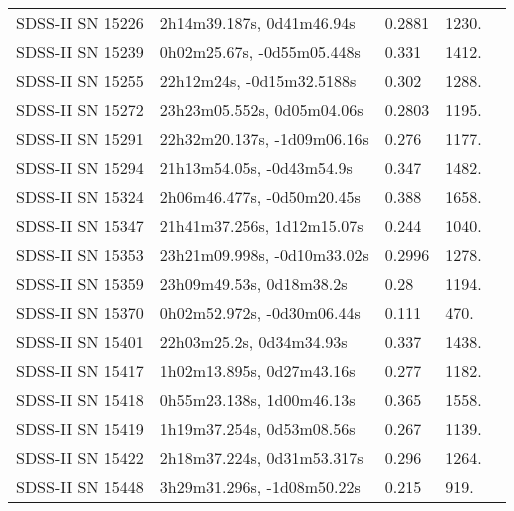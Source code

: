 \begin{longtable}{lllll}
 SDSS-II SN 15226 &      2h14m39.187s, 0d41m46.94s &   0.2881 &          1230. &    \citet{2008AJ....135.1311A} \\
 SDSS-II SN 15239 &     0h02m25.67s, -0d55m05.448s &    0.331 &          1412. &    \citet{2011ApJ...738..162S} \\
 SDSS-II SN 15255 &      22h12m24s, -0d15m32.5188s &    0.302 &          1288. &    \citet{2011ApJ...738..162S} \\
 SDSS-II SN 15272 &     23h23m05.552s, 0d05m04.06s &   0.2803 &          1195. &    \citet{2011ApJ...738..162S} \\
 SDSS-II SN 15291 &    22h32m20.137s, -1d09m06.16s &    0.276 &          1177. &    \citet{2011ApJ...738..162S} \\
 SDSS-II SN 15294 &      21h13m54.05s, -0d43m54.9s &    0.347 &          1482. &    \citet{2010ApJ...713.1026D} \\
 SDSS-II SN 15324 &     2h06m46.477s, -0d50m20.45s &    0.388 &          1658. &    \citet{2010ApJ...713.1026D} \\
 SDSS-II SN 15347 &     21h41m37.256s, 1d12m15.07s &    0.244 &          1040. &    \citet{2011ApJ...738..162S} \\
 SDSS-II SN 15353 &    23h21m09.998s, -0d10m33.02s &   0.2996 &          1278. &    \citet{2011ApJ...738..162S} \\
 SDSS-II SN 15359 &       23h09m49.53s, 0d18m38.2s &     0.28 &          1194. &    \citet{2011ApJ...738..162S} \\
 SDSS-II SN 15370 &     0h02m52.972s, -0d30m06.44s &    0.111 &           470. &    \citet{2011ApJ...738..162S} \\
 SDSS-II SN 15401 &       22h03m25.2s, 0d34m34.93s &    0.337 &          1438. &    \citet{2011ApJ...738..162S} \\
 SDSS-II SN 15417 &      1h02m13.895s, 0d27m43.16s &    0.277 &          1182. &    \citet{2011ApJ...738..162S} \\
 SDSS-II SN 15418 &      0h55m23.138s, 1d00m46.13s &    0.365 &          1558. &    \citet{2011ApJ...738..162S} \\
 SDSS-II SN 15419 &      1h19m37.254s, 0d53m08.56s &    0.267 &          1139. &    \citet{2010ApJ...713.1026D} \\
 SDSS-II SN 15422 &     2h18m37.224s, 0d31m53.317s &    0.296 &          1264. &    \citet{2011ApJ...738..162S} \\
 SDSS-II SN 15448 &     3h29m31.296s, -1d08m50.22s &    0.215 &           919. &    \citet{2011ApJ...738..162S} \\

\end{longtable}
